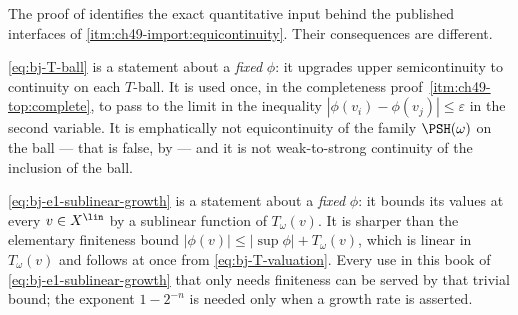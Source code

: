 \begin{remark}
\label{rem:ch49-two-quantitative}
The proof of 
identifies the exact quantitative input behind the published
interfaces of \cref{itm:ch49-import:equicontinuity}.
Their consequences are different.

\eqref{eq:bj-T-ball} is a statement about a \emph{fixed} $\phi$: it
upgrades upper semicontinuity to continuity on each $T$-ball.  It is used
once, in the completeness proof
\,\cref{itm:ch49-top:complete}, to
pass to the limit in the inequality $|\phi(v_i)-\phi(v_j)|\le\varepsilon$
in the second variable.  It is emphatically not equicontinuity of the
family $\PSH(\omega)$ on the ball --- that is false, by
 --- and it is not weak-to-strong continuity
of the inclusion of the ball.

\eqref{eq:bj-e1-sublinear-growth} is a statement about a \emph{fixed}
$\phi$: it bounds its values at every $v\in X^{\lin}$ by a
sublinear function of $T_\omega(v)$.  It is sharper than the elementary finiteness bound
$|\phi(v)|\le|\sup\phi|+T_\omega(v)$, which is linear in $T_\omega(v)$
and follows at once from \eqref{eq:bj-T-valuation}.  Every use in this book
of \eqref{eq:bj-e1-sublinear-growth} that only needs finiteness can be
served by that trivial bound; the exponent $1-2^{-n}$ is needed only when
a growth rate is asserted.
\end{remark}

